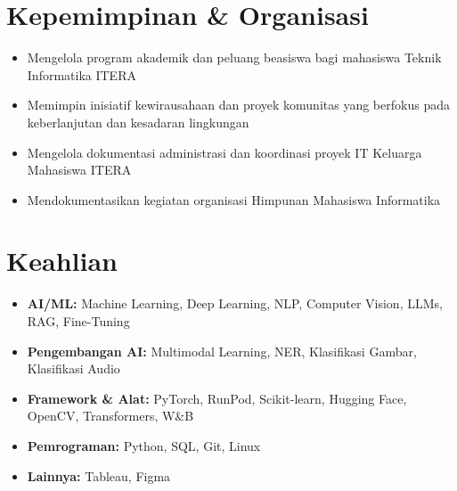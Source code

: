 \section*{Kepemimpinan \& Organisasi}
\begin{itemize}
  \item Mengelola program akademik dan peluang beasiswa bagi mahasiswa Teknik Informatika ITERA
\end{itemize}

\begin{itemize}
  \item Memimpin inisiatif kewirausahaan dan proyek komunitas yang berfokus pada keberlanjutan dan kesadaran lingkungan
\end{itemize}

\begin{itemize}
  \item Mengelola dokumentasi administrasi dan koordinasi proyek IT Keluarga Mahasiswa ITERA
\end{itemize}

\begin{itemize}
  \item Mendokumentasikan kegiatan organisasi Himpunan Mahasiswa Informatika
\end{itemize}

\section*{Keahlian}
\begin{itemize}
  \item \textbf{AI/ML:} Machine Learning, Deep Learning, NLP, Computer Vision, LLMs, RAG, Fine-Tuning
  \item \textbf{Pengembangan AI:} Multimodal Learning, NER, Klasifikasi Gambar, Klasifikasi Audio
  \item \textbf{Framework \& Alat:} PyTorch, RunPod, Scikit-learn, Hugging Face, OpenCV, Transformers, W\&B
  \item \textbf{Pemrograman:} Python, SQL, Git, Linux
  \item \textbf{Lainnya:} Tableau, Figma
\end{itemize}

